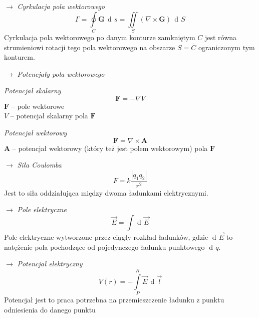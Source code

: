 \documentclass[12pt]{article}
\newenvironment{wzor}[1]{\par{\Large $\longrightarrow$ \textit{#1}}}
    {\newline {\color{grey} \rule{\linewidth}{0.3pt}}}
\DeclareMathOperator{\der}{\operatorname{d}\!}
\begin{document}
\newpage

\begin{wzor}{Cyrkulacja pola wektorowego}
    \begin{equation}
        \Gamma = \oint\limits_C \mathbf{G} \, \der s
            = \iint\limits_S (\nabla \times \mathbf{G}) \, \der S
    \end{equation}
    Cyrkulacja pola wektorowego po danym konturze zamkniętym $C$ jest równa strumieniowi
    rotacji tego pola wektorowego na obszarze $S = \overline{C}$ ograniczonym tym konturem.
\end{wzor}

\begin{wzor}{Potencjały pola wektorowego}
    \par \textit{Potencjał skalarny}
    \begin{equation}
        \mathbf{F} = - \nabla V
    \end{equation}
    $\mathbf{F}$ -- pole wektorowe\\
    $V$ -- potencjał skalarny pola $\mathbf{F}$
    \par \textit{Potencjał wektorowy}
    \begin{equation}
        \mathbf{F} = \nabla \times \mathbf{A}
    \end{equation}
    $\mathbf{A}$ -- potencjał wektorowy (który też jest polem wektorowym) pola $\mathbf{F}$
\end{wzor}

\begin{wzor}{Siła Coulomba}
    \begin{equation}
        F = k \frac{|q_1 q_2|}{r^2}
    \end{equation}
    Jest to siła oddziałująca między dwoma ładunkami elektrycznymi.
\end{wzor}

\begin{wzor}{Pole elektryczne}
    \begin{equation}
        \Vec{E} = \int \der \Vec{E}
    \end{equation}
    Pole elektryczne wytworzone przez ciągły rozkład ładunków, gdzie $\der\Vec{E}$ to
    natężenie pola pochodzące od pojedynczego ładunku punktowego $\der q$.
\end{wzor}

\begin{wzor}{Potencjał elektryczny}
    \begin{equation}
        V(r) = - \int\limits_P^R \Vec{E} \, \der\Vec{l}
    \end{equation}
    Potencjał jest to praca potrzebna na przemieszczenie ładunku z punktu odniesienia
    do danego punktu
\end{wzor}
\end{document}
